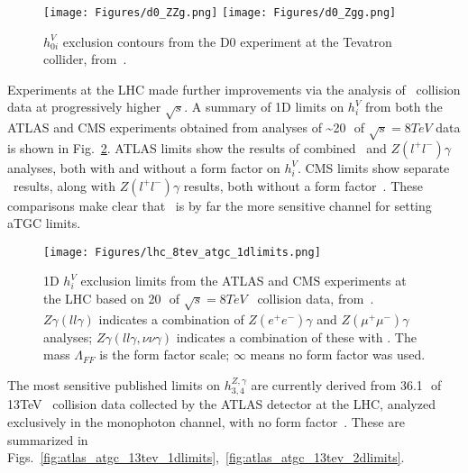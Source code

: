 \begin{figure}[hbtp]
  \begin{center}
    \texttt{[image: Figures/d0\_ZZg.png]}
    \texttt{[image: Figures/d0\_Zgg.png]}
    \caption{
      $h_{0i}^{V}$ exclusion contours from the D0 experiment at the Tevatron collider, from~\cite{ref:PhysRevD.85.052001}.
    }
    \label{fig:d0_aTGC}
  \end{center}
\end{figure}

Experiments at the LHC made further improvements via the analysis of \Pp\Pp\ collision data at progressively higher $\sqrt{s}$.
A summary of 1D limits on $h_{i}^{V}$ from both the ATLAS and CMS experiments obtained from analyses of \textasciitilde20\,\fbinv\ of $\sqrt{s} = 8\unit{TeV}$ data
is shown in Fig.~\ref{fig:lhc_8tev_atgc_1dlimits}. ATLAS limits show the results of combined \zinvg\ and $Z(l^\mathrm{+}l^\mathrm{-})\gamma$
analyses, both with and without a form factor on $h_{i}^{V}$. CMS limits show separate \zinvg\ results, along with $Z(l^\mathrm{+}l^\mathrm{-})\gamma$
results, both without a form factor~\cite{ref:RevModPhys.89.035008}. These comparisons make clear that \zinvg\ is by far
the more sensitive channel for setting aTGC limits.

\begin{figure}[hbtp]
  \begin{center}
    \texttt{[image: Figures/lhc\_8tev\_atgc\_1dlimits.png]}
    \caption{
      1D $h_{i}^{V}$ exclusion limits from the ATLAS and CMS experiments at the LHC based on 20\,\fbinv\ of $\sqrt{s} = 8\unit{TeV}$
      \Pp\Pp\ collision data, from~\cite{ref:RevModPhys.89.035008}.
      $Z\gamma(ll\gamma)$ indicates a combination of $Z(e^\mathrm{+}e^\mathrm{-})\gamma$ and $Z(\mu^\mathrm{+}\mu^\mathrm{-})\gamma$
      analyses; $Z\gamma(ll\gamma,\nu\nu\gamma)$ indicates a combination of these with \zinvg. The mass $\Lambda_{FF}$
      is the form factor scale; $\infty$ means no form factor was used.
    }
    \label{fig:lhc_8tev_atgc_1dlimits}
  \end{center}
\end{figure}

The most sensitive published limits on $h_{3,4}^{Z,\gamma}$ are currently derived from 36.1\,\fbinv\ of 13\unit{TeV} \Pp\Pp\ collision
data collected by the ATLAS detector at the LHC, analyzed exclusively in the monophoton channel, with no form factor~\cite{ref:CERN-EP-2018-220}.
These are summarized in Figs.~\ref{fig:atlas_atgc_13tev_1dlimits},~\ref{fig:atlas_atgc_13tev_2dlimits}.

